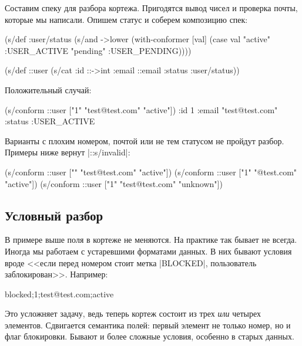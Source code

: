 Составим спеку для разбора кортежа. Пригодятся вывод чисел и проверка почты,
которые мы написали. Опишем статус и соберем композицию спек:

\begin{english}
  \begin{clojure}
(s/def :user/status
  (s/and ->lower
         (with-conformer [val]
           (case val
             "active"  :USER_ACTIVE
             "pending" :USER_PENDING))))

(s/def ::user
  (s/cat :id ::->int
         :email ::email
         :status :user/status))
  \end{clojure}
\end{english}

\noindent
Положительный случай:

\begin{english}
  \begin{clojure}
(s/conform ::user ["1" "test@test.com" "active"])
{:id 1
 :email "test@test.com"
 :status :USER_ACTIVE}
  \end{clojure}
\end{english}

Варианты с плохим номером, почтой или не тем статусом не пройдут разбор. Примеры
ниже вернут \spverb|::s/invalid|:

\begin{english}
  \begin{clojure}
(s/conform ::user ["" "test@test.com" "active"])
(s/conform ::user ["1" "@test.com" "active"])
(s/conform ::user ["1" "test@test.com" "unknown"])
  \end{clojure}
\end{english}

\subsection{Условный разбор}

В примере выше поля в кортеже не меняются. На практике так бывает не
всегда. Иногда мы работаем с устаревшими форматами данных. В них бывают условия
вроде <<если перед номером стоит метка \spverb|BLOCKED|, пользователь
заблокирован>>. Например:

\begin{english}
  \begin{clojure}
blocked;1;test@test.com;active
  \end{clojure}
\end{english}

Это усложняет задачу, ведь теперь кортеж состоит из трех \emph{или} четырех
элементов. Сдвигается семантика полей: первый элемент не только номер, но и флаг
блокировки. Бывают и более сложные условия, особенно в старых данных.

